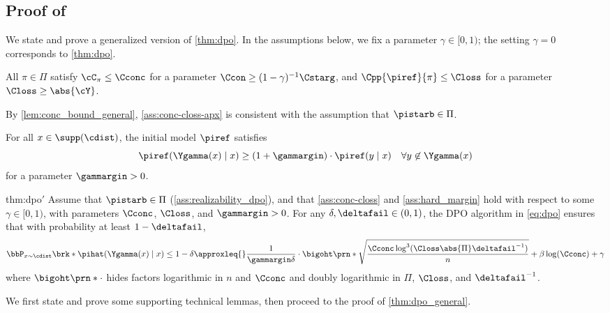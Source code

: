 


\subsection{Proof of }

We state and prove a generalized version of \cref{thm:dpo}. In the
assumptions below, we fix a parameter $\gamma \in [0,1)$; the setting $\gamma = 0$ corresponds to \cref{thm:dpo}.

\begin{assumption}[Coverage]
  \label{ass:conc-closs-apx}
  All $\pi\in\Pi$ satisfy
  $\cC_{\pi} \leq \Cconc$
  for a parameter $\Ccon \geq (1-\gamma)^{-1}\Cstarg$, and
  $\Cpp{\piref}{\pi} \leq \Closs$
  for a parameter $\Closs \geq \abs{\cY}$.
\end{assumption}
By \cref{lem:conc_bound_general}, \cref{ass:conc-closs-apx} is consistent
with the assumption that $\pistarb\in\Pi$.

\begin{assumption}[Margin]
  \label{ass:hard_margin-apx}
  For all $x\in\supp(\cdist)$, the initial model $\piref$ satisfies
  \[
    \piref(\Ygamma(x)\mid{}x) \geq{}(1+\gammargin)\cdot\piref(y\mid{}x)\quad\forall{}y\not\in\Ygamma(x)
  \]
  for a parameter $\gammargin>0$.
\end{assumption}


      \begin{thmmod}{thm:dpo}{$'$}
        \label{thm:dpo_general}
                Assume that $\pistarb\in\Pi$ (\cref{ass:realizability_dpo}), and that
        \cref{ass:conc-closs} and \cref{ass:hard_margin} hold with respect to some $\gamma \in [0,1)$, with parameters
        $\Cconc$, $\Closs$, and $\gammargin>0$. For any $\delta,\deltafail\in(0,1)$,
        the DPO algorithm in \cref{eq:dpo} ensures that with
        probability at least $1-\deltafail$,
        \begin{align}
          \bbP_{x\sim\cdist}\brk*{\pihat(\Ygamma(x)\mid{}x)\leq{}1-\delta}
          \approxleq{}
          \frac{1}{\gammargin\delta}\cdot{}\bigoht\prn*{\sqrt{\frac{\Cconc\log^{3}(\Closs\abs{\Pi}\deltafail^{-1})}{n}}
          +\beta\log(\Cconc) + \gamma}
        \end{align}
        where $\bigoht\prn*{\cdot}$ hides factors logarithmic in $n$
        and $\Cconc$ and doubly logarithmic in $\Pi$, $\Closs$, and
        $\deltafail^{-1}$.
      \end{thmmod}

We first state and prove some supporting technical lemmas, then
proceed to the proof of \cref{thm:dpo_general}.

